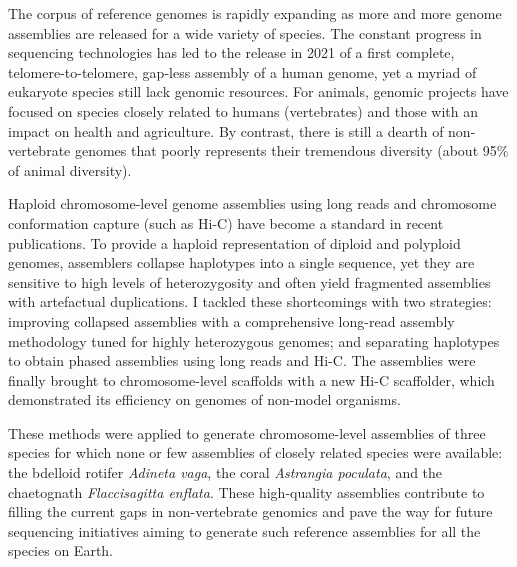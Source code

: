 The corpus of reference genomes is rapidly expanding as more and more genome assemblies are released for a wide variety of species. The constant progress in sequencing technologies has led to the release in 2021 of a first complete, telomere-to-telomere, gap-less assembly of a human genome, yet a myriad of eukaryote species still lack genomic resources. For animals, genomic projects have focused on species closely related to humans (vertebrates) and those with an impact on health and agriculture. By contrast, there is still a dearth of non-vertebrate genomes that poorly represents their tremendous diversity (about 95\% of animal diversity).

Haploid chromosome-level genome assemblies using long reads and chromosome conformation capture (such as Hi-C) have become a standard in recent publications. To provide a haploid representation of diploid and polyploid genomes, assemblers collapse haplotypes into a single sequence, yet they are sensitive to high levels of heterozygosity and often yield fragmented assemblies with artefactual duplications. I tackled these shortcomings with two strategies: improving collapsed assemblies with a comprehensive long-read assembly methodology tuned for highly heterozygous genomes; and separating haplotypes to obtain phased assemblies using long reads and Hi-C. The assemblies were finally brought to chromosome-level scaffolds with a new Hi-C scaffolder, which demonstrated its efficiency on genomes of non-model organisms.

These methods were applied to generate chromosome-level assemblies of three species for which none or few assemblies of closely related species were available: the bdelloid rotifer \textit{Adineta vaga}, the coral \textit{Astrangia poculata}, and the chaetognath \textit{Flaccisagitta enflata}. These high-quality assemblies contribute to filling the current gaps in non-vertebrate genomics and pave the way for future sequencing initiatives aiming to generate such reference assemblies for all the species on Earth.